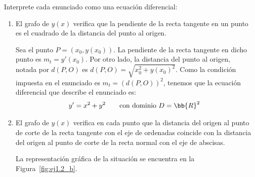 \begin{ejercicio} \label{ej:1.2}
    Interprete cada enunciado como una ecuación diferencial:
    \begin{enumerate}
        \item El grafo de \(y(x)\) verifica que la pendiente de la recta tangente en un punto es el cuadrado de la distancia del punto al origen.
        
        Sea el punto \(P=(x_0, y(x_0))\). La pendiente de la recta tangente en dicho punto es \(m_t = y'(x_0)\).
        Por otro lado, la distancia del punto al origen, notada por $d(P, O)$ es \(d(P, O)=\sqrt{x_0^2 + y(x_0)^2}\). Como la condición impuesta en el enunciado es $m_t=(d(P, O))^2$, tenemos que la ecuación diferencial que describe el enunciado es:
        \begin{equation*}
            y'= x^2 + y^2 \qquad \text{con dominio } D=\bb{R}^2
        \end{equation*}
        \item \label{ej:1.2_b}
        El grafo de \(y(x)\) verifica en cada punto que la distancia del origen al punto de corte de la recta tangente con el eje de ordenadas coincide con la distancia del origen al punto de corte de la recta normal con el eje de abscisas.
        
        La representación gráfica de la situación se encuentra en la Figura~\ref{fig:ej1.2_b}.
        \begin{figure}
            \centering
\end{figure}
\end{enumerate}
\end{ejercicio}
